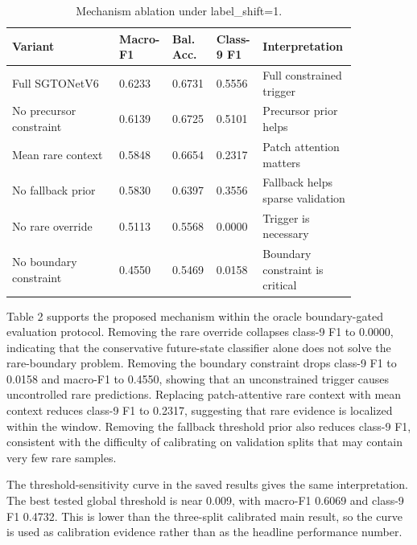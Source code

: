 \documentclass[12pt]{article}
\begin{document}
\begin{table}[t]
                \caption{Mechanism ablation under label\_shift=1.}
                \centering
                \scriptsize
                \setlength{\tabcolsep}{2.5pt}
                \renewcommand{\arraystretch}{1.05}
                \begin{tabular}{@{}p{0.30\linewidth} p{0.11\linewidth} p{0.11\linewidth} p{0.11\linewidth} p{0.22\linewidth}@{}}
                \toprule
                Variant & Macro-F1 & Bal. Acc. & Class-9 F1 & Interpretation \\ \midrule
Full SGTONetV6 & 0.6233 & 0.6731 & 0.5556 & Full constrained trigger \\
No precursor constraint & 0.6139 & 0.6725 & 0.5101 & Precursor prior helps \\
Mean rare context & 0.5848 & 0.6654 & 0.2317 & Patch attention matters \\
No fallback prior & 0.5830 & 0.6397 & 0.3556 & Fallback helps sparse validation \\
No rare override & 0.5113 & 0.5568 & 0.0000 & Trigger is necessary \\
No boundary constraint & 0.4550 & 0.5469 & 0.0158 & Boundary constraint is critical \\
                \bottomrule
                \end{tabular}
                \end{table}
Table 2 supports the proposed mechanism within the oracle boundary-gated evaluation protocol. Removing the rare override collapses class-9 F1 to 0.0000, indicating that the conservative future-state classifier alone does not solve the rare-boundary problem. Removing the boundary constraint drops class-9 F1 to 0.0158 and macro-F1 to 0.4550, showing that an unconstrained trigger causes uncontrolled rare predictions. Replacing patch-attentive rare context with mean context reduces class-9 F1 to 0.2317, suggesting that rare evidence is localized within the window. Removing the fallback threshold prior also reduces class-9 F1, consistent with the difficulty of calibrating on validation splits that may contain very few rare samples.

The threshold-sensitivity curve in the saved results gives the same interpretation. The best tested global threshold is near 0.009, with macro-F1 0.6069 and class-9 F1 0.4732. This is lower than the three-split calibrated main result, so the curve is used as calibration evidence rather than as the headline performance number.
\end{document}
